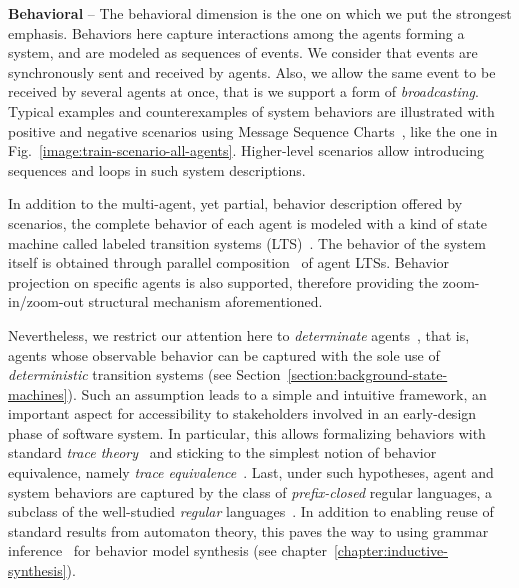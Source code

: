 \noindent \textbf{Behavioral} -- The behavioral dimension is the one on which we put the strongest emphasis. Behaviors here capture interactions among the agents forming a system, and are modeled as sequences of events. We consider that events are synchronously sent and received by agents. Also, we allow the same event to be received by several agents at once, that is we support a form of \emph{broadcasting}. Typical examples and counterexamples of system behaviors are illustrated with positive and negative scenarios using Message Sequence Charts~\cite{ITU:1996}, like the one in Fig.~\ref{image:train-scenario-all-agents}. Higher-level scenarios allow introducing sequences and loops in such system descriptions.

In addition to the multi-agent, yet partial, behavior description offered by scenarios, the complete behavior of each agent is modeled with a kind of state machine called labeled transition systems (LTS)~\cite{Keller:1976, Milner:1989}. The behavior of the system itself is obtained through parallel composition~\cite{Hoare:1985} of agent LTSs. Behavior  projection on specific agents is also supported, therefore providing the zoom-in/zoom-out structural mechanism aforementioned.

Nevertheless, we restrict our attention here to \emph{determinate} agents~\cite{Engelfriet:1985}, that is, agents whose observable behavior can be captured with the sole use of \emph{deterministic} transition systems (see Section~\ref{section:background-state-machines}). Such an assumption leads to a simple and intuitive framework, an important aspect for accessibility to stakeholders involved in an early-design phase of software system. In particular, this allows formalizing behaviors with standard \emph{trace theory}~\cite{Hoare:1985} and sticking to the simplest notion of behavior equivalence, namely \emph{trace equivalence}~\cite{Engelfriet:1985}. Last, under such hypotheses, agent and system behaviors are captured by the class of \emph{prefix-closed} regular languages, a subclass of the well-studied \emph{regular} languages~\cite{Hopcroft:1979, Aho:1986}. In addition to enabling reuse of standard results from automaton theory, this paves the way to using grammar inference~\cite{Gold:1978} for behavior model synthesis (see chapter~\ref{chapter:inductive-synthesis}). 

